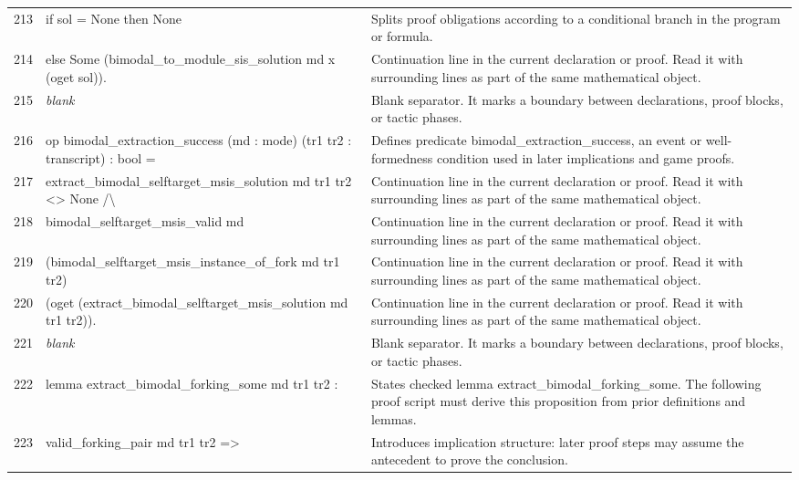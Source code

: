 \documentclass[10pt]{article}
\begin{document}
\begin{longtable}{r L{0.53\textwidth} L{0.37\textwidth}}
213 & {\ttfamily\scriptsize       if sol = None then None} & Splits proof obligations according to a conditional branch in the program or formula. \\
214 & {\ttfamily\scriptsize       else Some (bimodal\_to\_module\_sis\_solution md x (oget sol)).} & Continuation line in the current declaration or proof.  Read it with surrounding lines as part of the same mathematical object. \\
215 & {\ttfamily\scriptsize \emph{blank}} & Blank separator.  It marks a boundary between declarations, proof blocks, or tactic phases. \\
216 & {\ttfamily\scriptsize op bimodal\_extraction\_success (md : mode) (tr1 tr2 : transcript) : bool =} & Defines predicate bimodal\_extraction\_success, an event or well-formedness condition used in later implications and game proofs. \\
217 & {\ttfamily\scriptsize   extract\_bimodal\_selftarget\_msis\_solution md tr1 tr2 <> None /\textbackslash{}} & Continuation line in the current declaration or proof.  Read it with surrounding lines as part of the same mathematical object. \\
218 & {\ttfamily\scriptsize   bimodal\_selftarget\_msis\_valid md} & Continuation line in the current declaration or proof.  Read it with surrounding lines as part of the same mathematical object. \\
219 & {\ttfamily\scriptsize     (bimodal\_selftarget\_msis\_instance\_of\_fork md tr1 tr2)} & Continuation line in the current declaration or proof.  Read it with surrounding lines as part of the same mathematical object. \\
220 & {\ttfamily\scriptsize     (oget (extract\_bimodal\_selftarget\_msis\_solution md tr1 tr2)).} & Continuation line in the current declaration or proof.  Read it with surrounding lines as part of the same mathematical object. \\
221 & {\ttfamily\scriptsize \emph{blank}} & Blank separator.  It marks a boundary between declarations, proof blocks, or tactic phases. \\
222 & {\ttfamily\scriptsize lemma extract\_bimodal\_forking\_some md tr1 tr2 :} & States checked lemma extract\_bimodal\_forking\_some.  The following proof script must derive this proposition from prior definitions and lemmas. \\
223 & {\ttfamily\scriptsize   valid\_forking\_pair md tr1 tr2 =>} & Introduces implication structure: later proof steps may assume the antecedent to prove the conclusion. \\

\end{longtable}
\end{document}
